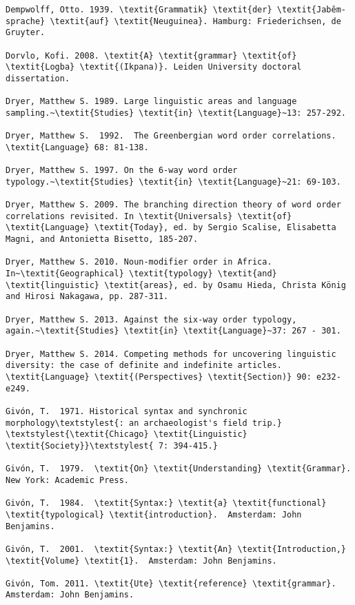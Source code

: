 \documentclass[output=paper]{langsci/langscibook}
\begin{document}
\begin{verbatim}
Dempwolff, Otto. 1939. \textit{Grammatik} \textit{der} \textit{Jabêm-sprache} \textit{auf} \textit{Neuguinea}. Hamburg: Friederichsen, de Gruyter.

Dorvlo, Kofi. 2008. \textit{A} \textit{grammar} \textit{of} \textit{Logba} \textit{(Ikpana)}. Leiden University doctoral dissertation.

Dryer, Matthew S. 1989. Large linguistic areas and language sampling.~\textit{Studies} \textit{in} \textit{Language}~13: 257-292.

Dryer, Matthew S.  1992.  The Greenbergian word order correlations.  \textit{Language} 68: 81-138.

Dryer, Matthew S. 1997. On the 6-way word order typology.~\textit{Studies} \textit{in} \textit{Language}~21: 69-103.

Dryer, Matthew S. 2009. The branching direction theory of word order correlations revisited. In \textit{Universals} \textit{of} \textit{Language} \textit{Today}, ed. by Sergio Scalise, Elisabetta Magni, and Antonietta Bisetto, 185-207.

Dryer, Matthew S. 2010. Noun-modifier order in Africa. In~\textit{Geographical} \textit{typology} \textit{and} \textit{linguistic} \textit{areas}, ed. by Osamu Hieda, Christa König and Hirosi Nakagawa, pp. 287-311.

Dryer, Matthew S. 2013. Against the six-way order typology, again.~\textit{Studies} \textit{in} \textit{Language}~37: 267 - 301.

Dryer, Matthew S. 2014. Competing methods for uncovering linguistic diversity: the case of definite and indefinite articles. \textit{Language} \textit{(Perspectives} \textit{Section)} 90: e232-e249.

Givón, T.  1971. Historical syntax and synchronic morphology\textstylest{: an archaeologist's field trip.} \textstylest{\textit{Chicago} \textit{Linguistic} \textit{Society}}\textstylest{ 7: 394-415.}

Givón, T.  1979.  \textit{On} \textit{Understanding} \textit{Grammar}. New York: Academic Press.

Givón, T.  1984.  \textit{Syntax:} \textit{a} \textit{functional} \textit{typological} \textit{introduction}.  Amsterdam: John Benjamins. 

Givón, T.  2001.  \textit{Syntax:} \textit{An} \textit{Introduction,} \textit{Volume} \textit{1}.  Amsterdam: John Benjamins.

Givón, Tom. 2011. \textit{Ute} \textit{reference} \textit{grammar}. Amsterdam: John Benjamins.


\end{verbatim}
\end{document}
